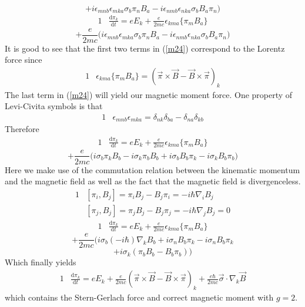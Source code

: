 \documentclass[]{article}
\numberwithin{equation}{subsection}
\begin{document}
$$
+i\epsilon_{mnb}\epsilon_{mka}\sigma_{b}\pi_{n}B_{a}-i\epsilon_{nmb}\epsilon_{nka}\sigma_{b}B_{a}\pi_{n}\Big)
$$
\begin{alignat}{1}
  \label{m24}		&\frac{\mathrm{d}\pi_{k}}{\mathrm{d}t}=eE_{k}+\frac{e}{2mc}\epsilon_{kma}\{\pi_{m}B_{a}\}
\end{alignat}
$$
+\frac{e}{2mc}\Big(i\epsilon_{mnb}\epsilon_{mka}\sigma_{b}\pi_{n}B_{a}-i\epsilon_{nmb}\epsilon_{nka}\sigma_{b}B_{a}\pi_{n}\Big)
$$
It is good to see that the first two terms in (\ref{m24}) correspond to the Lorentz force since
\begin{alignat}{1}
  \label{m25}		&\epsilon_{kma}\{\pi_{m}B_{a}\}=(\vec{\pi}\times\vec{B}-\vec{B}\times\vec{\pi})_{k}
\end{alignat}
The last term in (\ref{m24}) will yield our magnetic moment force. One property of Levi-Civita symbols is that
\begin{alignat}{1}
  \label{m26}		&\epsilon_{mnb}\epsilon_{mka}=\delta_{nk}\delta_{ba}-\delta_{na}\delta_{kb}
\end{alignat}
Therefore
\begin{alignat}{1}
  \label{m27}		&\frac{\mathrm{d}\pi_{k}}{\mathrm{d}t}=eE_{k}+\frac{e}{2mc}\epsilon_{kma}\{\pi_{m}B_{a}\}
\end{alignat}
$$
+\frac{e}{2mc}\Big(i\sigma_{b}\pi_{k}B_{b}-i\sigma_{k}\pi_{b}B_{b}+i\sigma_{b}B_{b}\pi_{k}-i\sigma_{k}B_{b}\pi_{b}\Big)
$$
Here we make use of the commutation relation between the kinematic momentum and the magnetic field as well as the fact that the magnetic field is divergenceless.
\begin{alignat}{1}
  \label{m28}		&[\pi_{i},B_{j}]=\pi_{i}B_{j}-B_{j}\pi_{i}=-i\hbar\nabla_{i}B_{j}\\
  \label{m29}		&[\pi_{j},B_{j}]=\pi_{j}B_{j}-B_{j}\pi_{j}=-i\hbar\nabla_{j}B_{j}=0
\end{alignat}
\begin{alignat}{1}
  \label{m30}		&\frac{\mathrm{d}\pi_{k}}{\mathrm{d}t}=eE_{k}+\frac{e}{2mc}\epsilon_{kma}\{\pi_{m}B_{a}\}
\end{alignat}
$$
+\frac{e}{2mc}\Big(i\sigma_{b}(-i\hbar)\nabla_{k}B_{b}+i\sigma_{n}B_{b}\pi_{k}-i\sigma_{n}B_{b}\pi_{k}
$$	$$
+i\sigma_{k}(\pi_{b}B_{b}-B_{b}\pi_{b})\Big)
$$
Which finally yields
\begin{alignat}{1}
  \label{m31}		&\frac{\mathrm{d}\pi_{k}}{\mathrm{d}t}=eE_{k}+\frac{e}{2mc}(\vec{\pi}\times\vec{B}-\vec{B}\times\vec{\pi})_{k}+\frac{e\hbar}{2mc}\vec{\sigma}\cdot\nabla_{k}\vec{B}
\end{alignat}
which contains the Stern-Gerlach force and correct magnetic moment with $g=2$.
\end{document}
